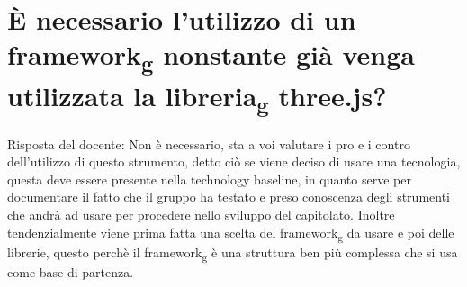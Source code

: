\section{È necessario l'utilizzo di un framework\textsubscript{g} nonstante già venga utilizzata la libreria\textsubscript{g} three.js?}
Risposta del docente: Non è necessario, sta a voi valutare i pro e i contro dell'utilizzo di questo strumento, detto ciò se viene deciso di usare una tecnologia, questa deve essere presente nella technology baseline, in quanto serve per documentare il fatto che il gruppo ha testato e preso conoscenza degli strumenti che andrà ad usare per procedere nello sviluppo del capitolato. Inoltre tendenzialmente viene prima fatta una scelta del framework\textsubscript{g} da usare e poi delle librerie, questo perchè il framework\textsubscript{g} è una struttura ben più complessa che si usa come base di partenza.
